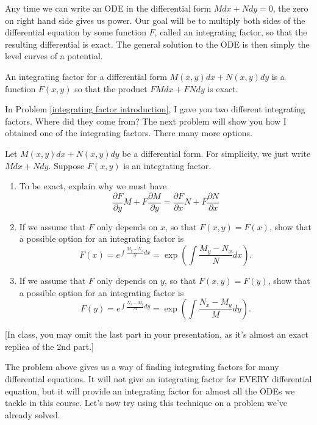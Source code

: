 Any time we can write an ODE in the differential form $Mdx+Ndy=0$, the zero on right hand side gives us power.  Our goal will be to multiply both sides of the differential equation by some function $F$, called an integrating factor, so that the resulting differential is exact.  The general solution to the ODE is then simply the level curves of a potential. 
\begin{definition}
 An integrating factor for a differential form $M(x,y)dx+N(x,y)dy$ is a function $F(x,y)$ so that the product $FMdx+FNdy$ is exact.
\end{definition}
In Problem \ref{integrating factor introduction}, I gave you two different integrating factors. Where did they come from?  The next problem will show you how I obtained one of the integrating factors.  There many more options.

\begin{problem}\label{integrating factor that depends only on x}
Let $M(x,y)dx+N(x,y)dy$ be a differential form.  For simplicity, we just write $Mdx+Ndy$.  Suppose $F(x,y)$ is an integrating factor.
\begin{enumerate}
 \item To be exact, explain why we must have 
$$
\dfrac{\partial F}{\partial y}M+F\dfrac{\partial M}{\partial y} 
= 
\dfrac{\partial F}{\partial x}N+F\dfrac{\partial N}{\partial x} 
$$
\item If we assume that $F$ only depends on $x$, so that $F(x,y)=F(x)$, show that a possible option for an integrating factor is
$$F(x)=e^{\int \frac{M_y-N_x}{N} dx} = \exp\left(\int \frac{M_y-N_x}{N} dx\right).$$
\item If we assume that $F$ only depends on $y$, so that $F(x,y)=F(y)$, show that a possible option for an integrating factor is
$$F(y)=e^{\int \frac{N_x-M_y}{M} dy} = \exp\left(\int \frac{N_x-M_y}{M} dy\right).$$
\end{enumerate}
[In class, you may omit the last part in your presentation, as it's almost an exact replica of the 2nd part.] 
 
\end{problem}

The problem above gives us a way of finding integrating factors for many differential equations. It will not give an integrating factor for EVERY differential equation, but it will provide an integrating factor for almost all the ODEs we tackle in this course. Let's now try using this technique on a problem we've already solved.


